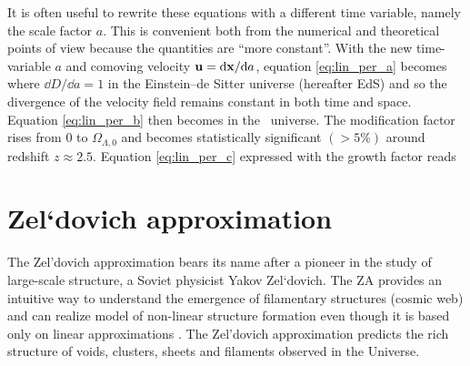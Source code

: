 It is often useful to rewrite these equations with a different time variable, namely the scale factor $a$. This is convenient both from the numerical and theoretical points of view because the quantities are ``more constant''. With the new time-variable $a$ and comoving velocity $\mathbf u = \mbox{d} \mathbf x/\mbox{d} a$, equation \eqref{eq:lin_per_a} becomes
where $\dd D/\dd a = 1$ in the Einstein--de Sitter universe (hereafter EdS) and so the divergence of the velocity field remains constant in both time and space. Equation \eqref{eq:lin_per_b} then becomes
in the \LCDM\ universe. The modification factor
rises from $0$ to $\Omega_{\Lambda,0}$ and becomes statistically significant $(>5\%)$ around redshift $z\approx2.5$. Equation \eqref{eq:lin_per_c} expressed with the growth factor reads
\section{Zel`dovich approximation}
The Zel'dovich approximation \parencite[hereafter ZA;][]{1970A&A.....5...84Z} bears its name after a pioneer in the study of large-scale structure, a Soviet physicist Yakov Zel`dovich. The ZA provides an intuitive way to understand the emergence of filamentary structures (cosmic web) and can realize model of non-linear structure formation even though it is based only on linear approximations \parencite{2014MNRAS.439.3630W}. The Zel’dovich approximation predicts the rich structure of voids, clusters, sheets and filaments observed in the Universe.


